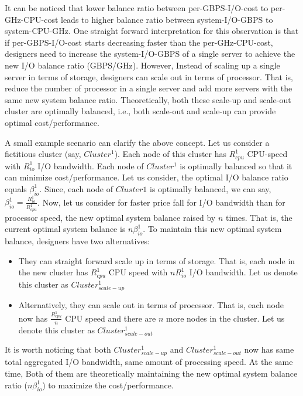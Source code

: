 \documentclass[journal]{IEEEtran}
\begin{document}
It can be noticed that lower balance ratio between per-GBPS-I/O-cost to per-GHz-CPU-cost  leads to higher balance ratio between system-I/O-GBPS  to system-CPU-GHz.
One straight forward interpretation for this observation is that if per-GBPS-I/O-cost starts decreasing faster than the per-GHz-CPU-cost, designers need to increase the system-I/O-GBPS of a single server to achieve the new I/O balance ratio (GBPS/GHz). However, Instead of scaling up a single server in terms of storage, designers can scale out in terms of processor. That is, reduce the number of processor in a single server and add more servers with the same new system balance ratio. Theoretically, both these scale-up and scale-out cluster are optimally balanced, i.e., both scale-out and scale-up can provide optimal cost/performance.

A small example scenario can clarify the above concept. Let us consider a fictitious cluster (say, $Cluster^{1}$). Each node of this cluster has $R_{cpu}^{1}$ CPU-speed with $R_{io}^{1}$ I/O bandwidth. Each node of $Cluster^{1}$ is optimally balanced so that it can minimize cost/performance. Let us consider, the optimal I/O balance ratio equals $\beta_{io}^{1}$. Since, each node of $Cluster1$ is optimally balanced, we can say, $\beta_{io}^{1}=\frac{R_{io}^{1}}{R_{cpu}^{1}}$. Now, let us consider for faster price fall for I/O bandwidth than for processor speed, the new optimal system balance raised by $n$ times. That is, the current optimal system balance is $n\beta_{io}^{1}$. To maintain this new optimal system balance, designers have two alternatives:
\begin{itemize}
\item They can straight forward scale up in terms of storage. That is, each node in the new cluster has $R_{cpu}^{1}$ CPU speed  with $nR_{io}^{1}$ I/O bandwidth. Let us denote this cluster as $Cluster^{1}_{scale-up}$
\item Alternatively, they can scale out in terms of processor. That is, each node now has $\frac{R_{cpu}^{1}}{n}$ CPU speed and there are $n$ more nodes in the cluster. Let us denote this cluster as $Cluster^{1}_{scale-out}$
\end{itemize}
It is worth noticing that both $Cluster^{1}_{scale-up}$ and  $Cluster^{1}_{scale-out}$ now has same total aggregated I/O bandwidth, same amount of processing speed. At the same time, Both of them are theoretically maintaining the new optimal system balance ratio ($n\beta_{io}^{1}$) to maximize the cost/performance. 
\end{document}
